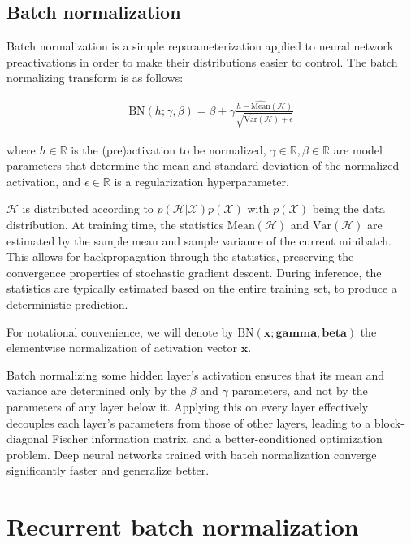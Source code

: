 \documentclass{article} %
\newcommand{\vect}[1]{\mathbf{#1}}
\newcommand{\reals}{\mathbb{R}}
\begin{document}
\subsection{Batch normalization}

Batch normalization is a simple reparameterization applied to neural network preactivations in order to make their distributions easier to control.
The batch normalizing transform is as follows:

\begin{align}
\mathrm{BN}(h; \gamma, \beta) =
  \beta + \gamma
  \frac{h -   \widehat{\mathrm{Mean}}(\mathcal{H})}
       {\sqrt{\widehat{\mathrm{Var }}(\mathcal{H}) + \epsilon}}
\end{align}

where $h \in \reals$ is the (pre)activation to be normalized, $\gamma \in \reals, \beta \in \reals$ are model parameters that determine the mean and standard deviation of the normalized activation, and $\epsilon \in \reals$ is a regularization hyperparameter.

$\mathcal{H}$ is distributed according to $p(\mathcal{H}|\mathcal{X}) p(\mathcal{X})$ with $p(\mathcal{X})$ being the data distribution.
At training time, the statistics $\mathrm{Mean}(\mathcal{H})$ and $\mathrm{Var}(\mathcal{H})$ are estimated by the sample mean and sample variance of the current minibatch.
This allows for backpropagation through the statistics, preserving the convergence properties of stochastic gradient descent.
During inference, the statistics are typically estimated based on the entire training set, to produce a deterministic prediction.

For notational convenience, we will denote by $\mathrm{BN}(\vect{x}; \vect{gamma}, \vect{beta})$ the elementwise normalization of activation vector $\vect{x}$.

Batch normalizing some hidden layer's activation ensures that its mean and variance are determined only by the $\beta$ and $\gamma$ parameters, and not by the parameters of any layer below it.
Applying this on every layer effectively decouples each layer's parameters from those of other layers, leading to a block-diagonal Fischer information matrix, and a better-conditioned optimization problem.
Deep neural networks trained with batch normalization converge significantly faster and generalize better.

\section{Recurrent batch normalization}
\end{document}
